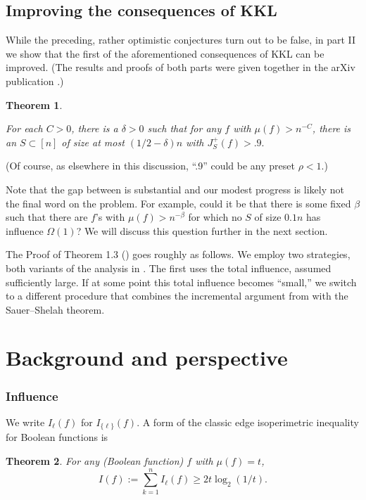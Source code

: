 \documentclass{toc}
\newtheorem{thm}{Theorem}[section]
\newcommand{\nin}[0]{\noindent}
\newcommand{\0}[0]{\emptyset}
\newcommand{\gb}[0]{\beta }
\newcommand{\gO}[0]{\Omega}
\begin{document}
\subsection *{Improving the consequences of KKL}

While the preceding, rather optimistic conjectures turn out to be false, 
in part II  we show
that the first of the aforementioned consequences of KKL can be 
improved. (The results and proofs of both parts were given together in
the arXiv publication \cite {BKK21}.) 
%
%

\noindent
\begin{thm}\label{prop3}

For each $C>0$, there is a $\delta>0$ such that for any $f$ with 
$\mu(f) >n^{-C}$, there
is an $S\subset [n]$ of size at most $(1/2-\delta)n$ with $J_{S}^{+}(f)>.9.$
\end {thm}
\nin
(Of course, as elsewhere in this discussion, ``.9'' could be any preset $\rho <1$.)

Note that the gap between   is substantial 
and our modest progress is likely not the final word on the problem.
For example, could it be that there is some fixed $\gb$ such that there
are $f$'s with %
%
%
$\mu(f) > n^{-\gb}$ for which no $S$ of size $0.1 n$ has influence $\gO(1)$?
We will discuss this question further in the next section.


%
%
%
The Proof of Theorem 1.3 (\cite {BKK21}) goes roughly as follows.
We employ two strategies, both variants of the analysis in \cite{kkl}.
The first 
uses the total influence, assumed sufficiently large.
If at some point this total influence becomes ``small,'' 
we switch to a different procedure that
combines the incremental argument from \cite{kkl} with the 
Sauer--Shelah %
theorem.  %

\section {Background and perspective}
\label{s:bac}

\subsubsection *{Influence}

We write $I_\ell (f)$ for $I_{\{\ell\}}(f)$.  A form of
the classic edge isoperimetric inequality for Boolean
functions is  
%

\begin{thm}\label{Tiso}
For any (Boolean function) $f$ %
%
 with $\mu(f) =t$,
\begin {equation}
\label {e:harper}
I(f) := \sum_{k=1}^n  I_\ell (f) \ge  2t \log_2 (1/t).
\end {equation}
\end {thm}
\end{document}
